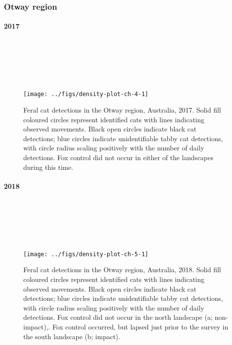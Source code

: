 \documentclass[preprint, 3p, authoryear]{elsarticle} %
\begin{document}
\newpage

\hypertarget{otway-region-2}{%
\subsubsection{Otway region}\label{otway-region-2}}

\hypertarget{section}{%
\paragraph*{2017}\label{section}}

\(~\)

\(~\)

\(~\)

\begin{figure}

{\centering \texttt{[image: ../figs/density-plot-ch-4-1]} 

}

\caption{Feral cat detections in the Otway region, Australia, 2017. Solid fill coloured circles represent identified cats with lines indicating observed movements. Black open circles indicate black cat detections; blue circles indicate unidentifiable tabby cat detections, with circle radius scaling positively with the number of daily detections. Fox control did not occur in either of the landscapes during this time.}\label{fig:density-plot-ch-4}
\end{figure}

\newpage

\hypertarget{section-1}{%
\paragraph*{2018}\label{section-1}}

\(~\)

\(~\)

\(~\)

\begin{figure}

{\centering \texttt{[image: ../figs/density-plot-ch-5-1]} 

}

\caption{Feral cat detections in the Otway region, Australia, 2018. Solid fill coloured circles represent identified cats with lines indicating observed movements. Black open circles indicate black cat detections; blue circles indicate unidentifiable tabby cat detections, with circle radius scaling positively with the number of daily detections. Fox control did not occur in the north landscape (a; non-impact),. Fox control occurred, but lapsed just prior to the survey in the south landscape (b; impact).}\label{fig:density-plot-ch-5}
\end{figure}
\end{document}
